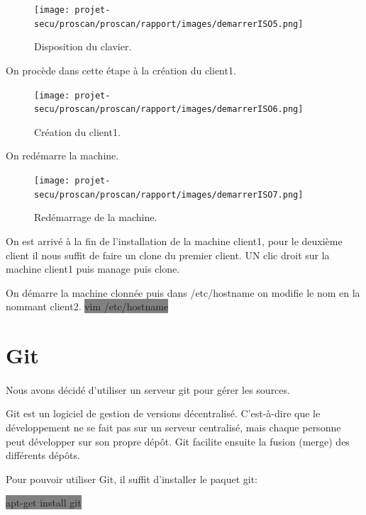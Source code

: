 \documentclass[11pt,a4paper,titlepage, oneside]{article}
\begin{document}
		 \begin{figure}[h]
                        \centering
                        \texttt{[image: projet-secu/proscan/proscan/rapport/images/demarrerISO5.png]}
                        \caption{Disposition du clavier.}
                \end{figure}

		\newpage

		On procède dans cette étape à la création du client1.	
		\begin{figure}[h]
                        \centering
                        \texttt{[image: projet-secu/proscan/proscan/rapport/images/demarrerISO6.png]}
                        \caption{Création du client1.}
                \end{figure}

		\newpage
		On redémarre la machine.

	\begin{figure}[h]
                        \centering
                        \texttt{[image: projet-secu/proscan/proscan/rapport/images/demarrerISO7.png]}
                        \caption{Redémarrage de la machine.}
                \end{figure}
	
		On est arrivé à la fin de l'installation de la machine client1, pour le deuxième client il nous suffit de faire un clone du premier client. UN clic droit sur la machine client1 puis manage puis clone.

	On démarre la machine clonnée puis dans /etc/hostname on modifie le nom en la nommant client2.
		\colorbox{gray}{vim /etc/hostname}

	
\newpage
\section{{\color{red} Git}}
	\paragraph{}
		Nous avons décidé d'utiliser un serveur git pour gérer les sources.
		
		Git est un logiciel de gestion de versions décentralisé. C'est-à-dire que le développement ne se fait pas sur un serveur centralisé, mais chaque personne peut développer sur son propre dépôt. Git facilite ensuite la fusion (merge) des différents dépôts.

		Pour pouvoir utiliser Git, il suffit d'installer le paquet git:
	
		\colorbox{gray} {apt-get install git}
\end{document}
